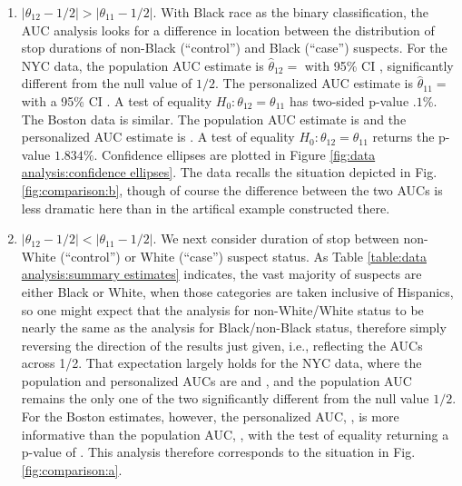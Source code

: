 \documentclass[12pt]{article}
\DeclareMathOperator{\AUC}{AUC}
\newcommand{\cind}{\perp \!\!\! \perp}
\newcommand{\aucindiv}{\theta_{11}}%
\newcommand{\aucpop}{\theta_{12}}%
\newcommand{\aucindivhat}{\hat{\theta}_{11}}%
\newcommand{\aucpophat}{\hat{\theta}_{12}}%
\begin{document}
\begin{enumerate}
\item $|\aucpop-1/2| > |\aucindiv-1/2|$.  With Black race as the
  binary classification, the AUC analysis looks for a difference in
  location between the distribution of stop durations of non-Black
  (``control'') and Black (``case'') suspects. For the NYC data, the
  population AUC estimate is
  $\aucpophat=$ with 95\%
  CI \unskip, significantly
  different from the null value of $1/2$. The personalized AUC
  estimate is
  $\aucindivhat=$ with a
  95\% CI . A test of
  equality $H_0:\aucpop=\aucindiv$ has two-sided p-value $.1\%$. The
  Boston data is similar. The population AUC estimate is
   and the personalized AUC estimate
  is . A test of equality
  $H_0:\aucpop=\aucindiv$ returns the p-value $1.834\%$. Confidence
  ellipses are plotted in Figure \ref{fig:data analysis:confidence
    ellipses}. The data recalls the situation depicted in
  Fig. \ref{fig:comparison:b}, though of course the difference between
  the two AUCs is less dramatic here than in the artifical example
  constructed there.

\item $|\aucpop-1/2|<|\aucindiv-1/2|$. We next consider duration of
  stop between non-White (``control'') or White (``case'') suspect
  status. As Table \ref{table:data analysis:summary estimates}
  indicates, the vast majority of suspects are either Black or White,
  when those categories are taken inclusive of Hispanics, so one might
  expect that the analysis for non-White/White status to be nearly
  the same as the analysis for Black/non-Black status, therefore
  simply reversing the direction of the results just given, i.e.,
  reflecting the AUCs across 1/2. That expectation largely holds for
  the NYC data, where the population and personalized AUCs are
   and
  , and the population AUC
  remains the only one of the two significantly different from the
  null value $1/2$. For the Boston estimates, however, the
  personalized AUC, \unskip,
  is more informative than the population AUC,
  \unskip, with the test of
  equality returning a p-value of
  . This
  analysis therefore corresponds to the situation in
  Fig. \ref{fig:comparison:a}.


\end{enumerate}
\end{document}
